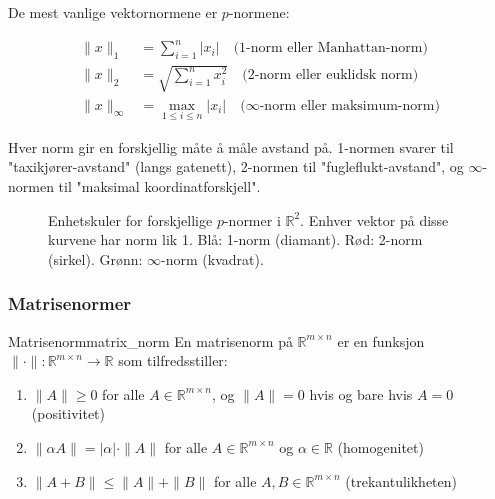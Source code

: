De mest vanlige vektornormene er $p$-normene:

\begin{align*}
	\|x\|_1      & = \sum_{i=1}^n |x_i| \quad \text{(1-norm eller Manhattan-norm)}                 \\
	\|x\|_2      & = \sqrt{\sum_{i=1}^n x_i^2} \quad \text{(2-norm eller euklidsk norm)}           \\
	\|x\|_\infty & = \max_{1 \leq i \leq n} |x_i| \quad \text{($\infty$-norm eller maksimum-norm)}
\end{align*}

Hver norm gir en forskjellig måte å måle avstand på. 1-normen svarer til "taxikjører-avstand" (langs gatenett), 2-normen til "fugleflukt-avstand", og $\infty$-normen til "maksimal koordinatforskjell".

\begin{figure}
	\centering
	\caption{Enhetskuler for forskjellige $p$-normer i $\mathbb{R}^2$. Enhver vektor på disse kurvene har norm lik 1. Blå: 1-norm (diamant). Rød: 2-norm (sirkel). Grønn: $\infty$-norm (kvadrat).}
	\label{fig:vector_norms}
\end{figure}

\subsubsection{Matrisenormer}

\begin{definition}{Matrisenorm}{matrix_norm}
	En matrisenorm på $\mathbb{R}^{m \times n}$ er en funksjon $\|\cdot\| : \mathbb{R}^{m \times n} \to \mathbb{R}$ som tilfredsstiller:
	\begin{enumerate}
		\item $\|A\| \geq 0$ for alle $A \in \mathbb{R}^{m \times n}$, og $\|A\| = 0$ hvis og bare hvis $A = 0$ (positivitet)
		\item $\|\alpha A\| = |\alpha| \cdot \|A\|$ for alle $A \in \mathbb{R}^{m \times n}$ og $\alpha \in \mathbb{R}$ (homogenitet)
		\item $\|A + B\| \leq \|A\| + \|B\|$ for alle $A,B \in \mathbb{R}^{m \times n}$ (trekantulikheten)
	\end{enumerate}
\end{definition}

